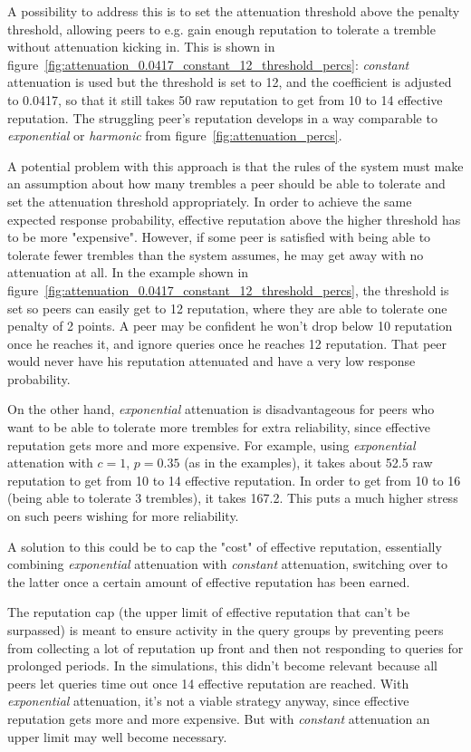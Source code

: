 A possibility to address this is to set the attenuation threshold above the
penalty threshold, allowing peers to e.g. gain enough reputation to tolerate a
tremble without attenuation kicking in. This is shown in
figure~\ref{fig:attenuation_0.0417_constant_12_threshold_percs}: \emph{constant}
attenuation is used but the threshold is set to 12, and the coefficient is
adjusted to 0.0417, so that it still takes 50 raw reputation to get from 10 to
14 effective reputation. The struggling peer's reputation develops in a way
comparable to \emph{exponential} or \emph{harmonic} from
figure~\ref{fig:attenuation_percs}.

A potential problem with this approach is that the rules of the system must make
an assumption about how many trembles a peer should be able to tolerate and set
the attenuation threshold appropriately. In order to achieve the same expected
response probability, effective reputation above the higher threshold has to be
more "expensive". However, if some peer is satisfied with being able to tolerate
fewer trembles than the system assumes, he may get away with no attenuation at
all. In the example shown in
figure~\ref{fig:attenuation_0.0417_constant_12_threshold_percs}, the threshold
is set so peers can easily get to 12 reputation, where they are able to tolerate
one penalty of 2 points. A peer may be confident he won't drop below 10
reputation once he reaches it, and ignore queries once he reaches 12 reputation.
That peer would never have his reputation attenuated and have a very low
response probability.

On the other hand, \emph{exponential} attenuation is disadvantageous for peers
who want to be able to tolerate more trembles for extra reliability, since
effective reputation gets more and more expensive. For example, using
\emph{exponential} attenation with $c = 1$, $p = 0.35$ (as in the examples), it
takes about 52.5 raw reputation to get from 10 to 14 effective reputation. In
order to get from 10 to 16 (being able to tolerate 3 trembles), it takes 167.2.
This puts a much higher stress on such peers wishing for more reliability.

A solution to this could be to cap the "cost" of effective reputation,
essentially combining \emph{exponential} attenuation with \emph{constant}
attenuation, switching over to the latter once a certain amount of effective
reputation has been earned.

The reputation cap (the upper limit of effective reputation that can't be
surpassed) is meant to ensure activity in the query groups by preventing peers
from collecting a lot of reputation up front and then not responding to queries
for prolonged periods. In the simulations, this didn't become relevant because
all peers let queries time out once 14 effective reputation are reached. With
\emph{exponential} attenuation, it's not a viable strategy anyway, since
effective reputation gets more and more expensive. But with \emph{constant}
attenuation an upper limit may well become necessary.

